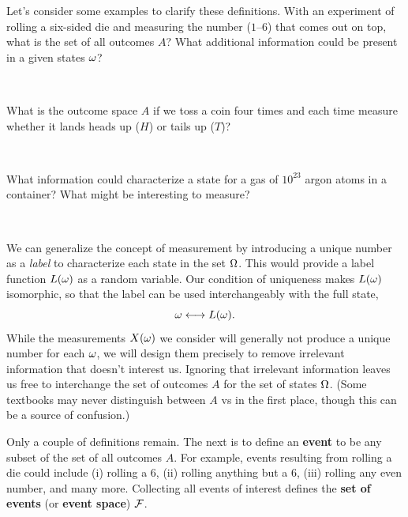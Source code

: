 Let's consider some examples to clarify these definitions.
With an experiment of rolling a six-sided die and measuring the number ($1$--$6$) that comes out on top, what is the set of all outcomes $A$?
What additional information could be present in a given states $\omega$?
\begin{mdframed}
  \ \\[100 pt]
\end{mdframed}
What is the outcome space $A$ if we toss a coin four times and each time measure whether it lands heads up ($H$) or tails up ($T$)? %
\begin{mdframed}
  \ \\[100 pt]
\end{mdframed}
What information could characterize a state \om for a gas of $10^{23}$ argon atoms in a container?
What might be interesting to measure?
\begin{mdframed}
  \ \\[100 pt]
\end{mdframed}

We can generalize the concept of measurement by introducing a unique number as a \textit{label} to characterize each state \om in the set $\Omega$.
This would provide a label function $L(\omega)$ as a random variable.
Our condition of uniqueness makes $L(\omega)$ isomorphic, so that the label can be used interchangeably with the full state,
\begin{equation*}
  \omega \longleftrightarrow L(\omega).
\end{equation*}
While the measurements $X(\omega)$ we consider will generally not produce a unique number for each $\omega$, we will design them precisely to remove irrelevant information that doesn't interest us.
Ignoring that irrelevant information leaves us free to interchange the set of outcomes $A$ for the set of states $\Omega$.
(Some textbooks may never distinguish between $A$ vs \Om in the first place, though this can be a source of confusion.)

Only a couple of definitions remain.
The next is to define an \textbf{event} to be any subset of the set of all outcomes $A$.
For example, events resulting from rolling a die could include (i) rolling a $6$, (ii) rolling anything but a $6$, (iii) rolling any even number, and many more.
Collecting all events of interest defines the \textbf{set of events} (or \textbf{event space}) $\mathcal F$.

